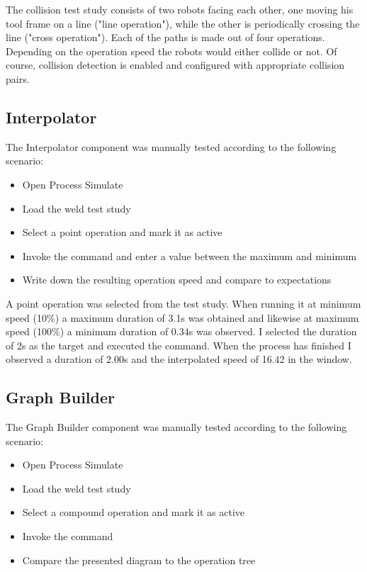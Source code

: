The collision test study consists of two robots facing each other, one moving his tool frame on a line ("line operation"), while the other is periodically crossing the line ("cross operation").
Each of the paths is made out of four operations.
Depending on the operation speed the robots would either collide or not.
Of course, collision detection is enabled and configured with appropriate collision pairs. \\

\subsection{Interpolator}

The Interpolator component was manually tested according to the following scenario: 

\begin{itemize}
    \item Open Process Simulate
    \item Load the weld test study
    \item Select a point operation and mark it as active
    \item Invoke the  command and enter a value between the maximum and minimum
    \item Write down the resulting operation speed and compare to expectations
\end{itemize}

A point operation was selected from the test study.
When running it at minimum speed (10\%) a maximum duration of 3.1s was obtained and likewise at maximum speed (100\%) a minimum duration of 0.34s was observed. 
I selected the duration of 2s as the target and executed the command.
When the process has finished I observed a duration of 2.00s and the interpolated speed of 16.42 in the  window.

\subsection{Graph Builder}

The Graph Builder component was manually tested according to the following scenario: 

\begin{itemize}
    \item Open Process Simulate
    \item Load the weld test study
    \item Select a compound operation and mark it as active
    \item Invoke the  command
    \item Compare the presented diagram to the operation tree
\end{itemize}

